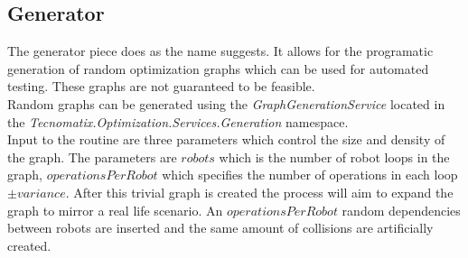 \subsection{Generator}


The generator piece does as the name suggests. It allows for the programatic generation of random optimization graphs which can be used for automated testing. These graphs are not guaranteed to be feasible. \\

Random graphs can be generated using the \emph{GraphGenerationService} located in the \emph{Tecnomatix.Optimization.Services.Generation} namespace. \\

Input to the routine are three parameters which control the size and density of the graph. The parameters are $robots$ which is the number of robot loops in the graph, $operationsPerRobot$ which specifies the number of operations in each loop $\pm variance$. After this trivial graph is created the process will aim to expand the graph to mirror a real life scenario. An $operationsPerRobot$ random dependencies between robots are inserted and the same amount of collisions are artificially created. \\

